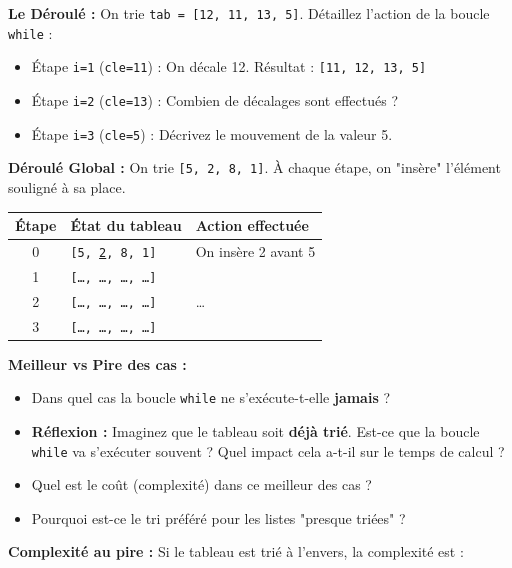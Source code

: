 \documentclass[12pt,a4paper]{report}
\begin{document}
\begin{Exercise}[title={Analyse du Tri par Insertion }]
    \Question \textbf{Le Déroulé :} On trie \texttt{tab = [12, 11, 13, 5]}. Détaillez l'action de la boucle \texttt{while} :
    \begin{itemize}
        \item Étape \texttt{i=1} (\texttt{cle=11}) : On décale 12. Résultat : \texttt{[11, 12, 13, 5]}
        \item Étape \texttt{i=2} (\texttt{cle=13}) : Combien de décalages sont effectués ? \dotfill
        \item Étape \texttt{i=3} (\texttt{cle=5}) : Décrivez le mouvement de la valeur 5. \dotfill
    \end{itemize}
    
    \Question \textbf{Déroulé Global :} On trie \texttt{[5, 2, 8, 1]}. À chaque étape, on "insère" l'élément souligné à sa place.
    \begin{center}
    \begin{tabular}{|c|l|l|}
    \hline
    Étape & État du tableau & Action effectuée \\ \hline
    0 & \texttt{[5, \underline{2}, 8, 1]} & On insère 2 avant 5 \\ \hline
    1 & \texttt{[\dots, \dots, \dots, \dots]} &  \\ \hline
    2 & \texttt{[\dots, \dots, \dots, \dots]} & \dots \\ \hline
    3 & \texttt{[\dots, \dots, \dots, \dots]} &  \\ \hline
    \end{tabular}
    \end{center}
    
    \Question \textbf{Meilleur vs Pire des cas :} 
    \begin{itemize}
        \item Dans quel cas la boucle \texttt{while} ne s'exécute-t-elle \textbf{jamais} ? \dotfill
        \item \textbf{Réflexion :} Imaginez que le tableau soit \textbf{déjà trié}. Est-ce que la boucle \texttt{while} va s'exécuter souvent ? Quel impact cela a-t-il sur le temps de calcul ?
    \dotfill
        \item Quel est le coût (complexité) dans ce meilleur des cas ? \dotfill
        \item Pourquoi est-ce le tri préféré pour les listes "presque triées" ? \dotfill
    \end{itemize}

    \Question \textbf{Complexité au pire :} Si le tableau est trié à l'envers, la complexité est : \dotfill
\end{Exercise}
\end{document}
